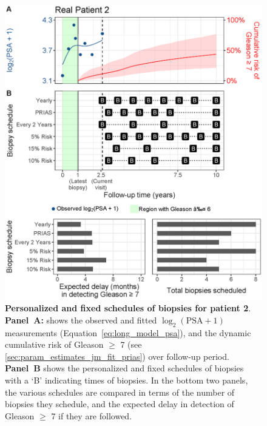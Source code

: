 \begin{figure}
\centerline{\includegraphics[width=\columnwidth]{images/demo_pat2_supp.eps}}
\caption{\textbf{Personalized and fixed schedules of biopsies for patient 2}. \textbf{Panel~A:} shows the observed and fitted $\log_2(\mbox{PSA} + 1)$ measurements (Equation~\ref{eq:long_model_psa}), and the dynamic cumulative risk of Gleason $\geq$ 7 (see \ref{sec:param_estimates_jm_fit_prias}) over follow-up period. \textbf{Panel~B} shows the personalized and fixed schedules of biopsies with a `B' indicating times of biopsies. In the bottom two panels, the various schedules are compared in terms of the number of biopsies they schedule, and the expected delay in detection of Gleason $\geq$ 7 if they are followed.}
\label{fig:demo_pat2_supp}
\end{figure}

